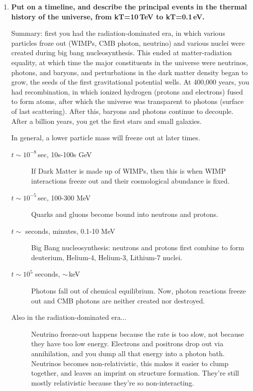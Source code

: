 \documentclass[12pt, letterpaper, preprint]{aastex}
\begin{document}
\begin{enumerate}

\item \textbf{Put on a timeline, and describe the principal events in the thermal history of the universe, from kT=10\,TeV to kT=0.1\,eV.}

Summary: first you had the radiation-dominated era, in which various particles froze out (WIMPs, CMB photon, neutrino) and various nuclei were created during big bang nucleosynthesis. This ended at matter-radiation equality, at which time the major constituents in the universe were neutrinos, photons, and baryons, and perturbations in the dark matter density began to grow, the seeds of the first gravitational potential wells. At 400,000 years, you had recombination, in which ionized hydrogen (protons and electrons) fused to form atoms, after which the universe was transparent to photons (surface of last scattering). After this, baryons and photons continue to decouple. After a billion years, you get the first stars and small galaxies.

In general, a lower particle mass will freeze out at later times. 

\begin{description}

\item[$t \sim 10^{-8}$\,sec, 10s-100s GeV] If Dark Matter is made up of WIMPs, then this is when WIMP interactions freeze out and their cosmological abundance is fixed.

\item[$t \sim 10^{-5}$\,sec, 100-300 MeV] Quarks and gluons become bound into neutrons and protons.

\item[$t \sim$ seconds, minutes, 0.1-10 MeV] Big Bang nucleosynthesis: neutrons and protons first combine to form deuterium, Helium-4, Helium-3, Lithium-7 nuclei. 

\item[$t \sim 10^5$ seconds, $\sim$\,keV] Photons fall out of chemical equilibrium. Now, photon reactions freeze out and CMB photons are neither created nor destroyed.

\item[Also in the radiation-dominated era...] Neutrino freeze-out happens because the rate is too slow, not because they have too low energy. Electrons and positrons drop out via annihilation, and you dump all that energy into a photon bath. Neutrinos becomes non-relativistic, this makes it easier to clump together, and leaves an imprint on structure formation. They're still mostly relativistic because they're so non-interacting. 


\end{description}
\end{enumerate}
\end{document}

